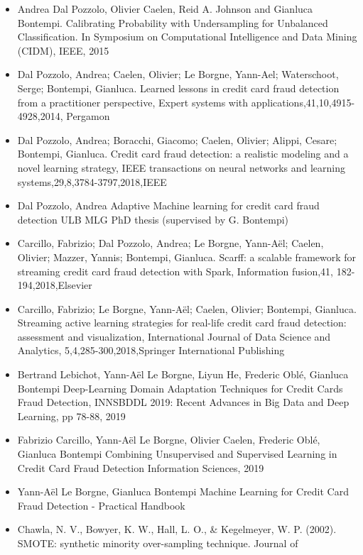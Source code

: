 \documentclass[
]{article}
\providecommand{\tightlist}{%
  \setlength{\itemsep}{0pt}\setlength{\parskip}{0pt}}
\begin{document}
\begin{itemize}
\tightlist
\item
  Andrea Dal Pozzolo, Olivier Caelen, Reid A. Johnson and Gianluca
  Bontempi. Calibrating Probability with Undersampling for Unbalanced
  Classification. In Symposium on Computational Intelligence and Data
  Mining (CIDM), IEEE, 2015
\item
  Dal Pozzolo, Andrea; Caelen, Olivier; Le Borgne, Yann-Ael;
  Waterschoot, Serge; Bontempi, Gianluca. Learned lessons in credit card
  fraud detection from a practitioner perspective, Expert systems with
  applications,41,10,4915-4928,2014, Pergamon
\item
  Dal Pozzolo, Andrea; Boracchi, Giacomo; Caelen, Olivier; Alippi,
  Cesare; Bontempi, Gianluca. Credit card fraud detection: a realistic
  modeling and a novel learning strategy, IEEE transactions on neural
  networks and learning systems,29,8,3784-3797,2018,IEEE
\item
  Dal Pozzolo, Andrea Adaptive Machine learning for credit card fraud
  detection ULB MLG PhD thesis (supervised by G. Bontempi)
\item
  Carcillo, Fabrizio; Dal Pozzolo, Andrea; Le Borgne, Yann-Aël; Caelen,
  Olivier; Mazzer, Yannis; Bontempi, Gianluca. Scarff: a scalable
  framework for streaming credit card fraud detection with Spark,
  Information fusion,41, 182-194,2018,Elsevier
\item
  Carcillo, Fabrizio; Le Borgne, Yann-Aël; Caelen, Olivier; Bontempi,
  Gianluca. Streaming active learning strategies for real-life credit
  card fraud detection: assessment and visualization, International
  Journal of Data Science and Analytics, 5,4,285-300,2018,Springer
  International Publishing
\item
  Bertrand Lebichot, Yann-Aël Le Borgne, Liyun He, Frederic Oblé,
  Gianluca Bontempi Deep-Learning Domain Adaptation Techniques for
  Credit Cards Fraud Detection, INNSBDDL 2019: Recent Advances in Big
  Data and Deep Learning, pp 78-88, 2019
\item
  Fabrizio Carcillo, Yann-Aël Le Borgne, Olivier Caelen, Frederic Oblé,
  Gianluca Bontempi Combining Unsupervised and Supervised Learning in
  Credit Card Fraud Detection Information Sciences, 2019
\item
  Yann-Aël Le Borgne, Gianluca Bontempi Machine Learning for Credit Card
  Fraud Detection - Practical Handbook
\item
  Chawla, N. V., Bowyer, K. W., Hall, L. O., \& Kegelmeyer, W. P.
  (2002). SMOTE: synthetic minority over-sampling technique. Journal of

\end{itemize}
\end{document}

